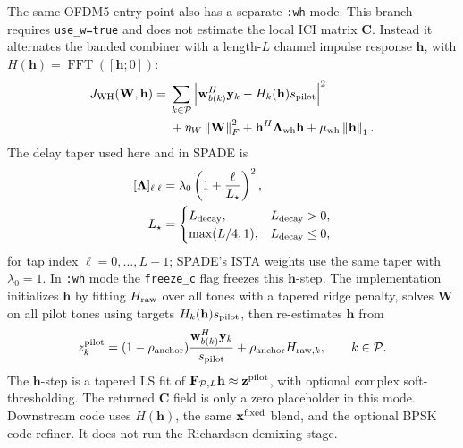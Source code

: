 \documentclass[journal]{IEEEtran}
\newcommand{\norm}[1]{\left\lVert #1 \right\rVert}
\newcommand{\abs}[1]{\left\lvert #1 \right\rvert}
\begin{document}
The same OFDM5 entry point also has a separate \texttt{:wh} mode. This branch
requires \texttt{use\_w=true} and does not estimate the local ICI matrix
\(\mathbf C\). Instead it alternates the banded combiner with a length-\(L\)
channel impulse response \(\mathbf h\), with
\(H(\mathbf h)=\operatorname{FFT}([\mathbf h;0])\):
\begin{equation}
\begin{aligned}
  J_{\rm WH}(\mathbf W,\mathbf h)
  ={}&\sum_{k\in\mathcal P}
    \abs{\mathbf w_{b(k)}^H\mathbf y_k-H_k(\mathbf h)s_{\rm pilot}}^2\\
  &+\eta_W\norm{\mathbf W}_F^2
    +\mathbf h^H\boldsymbol\Lambda_{\rm wh}\mathbf h
    +\mu_{\rm wh}\norm{\mathbf h}_1 .
\end{aligned}
  \label{eq:ofdm5-wh-loss}
\end{equation}
The delay taper used here and in SPADE is
\begin{equation}
\begin{aligned}
  [\boldsymbol\Lambda]_{\ell,\ell}
  &=\lambda_0\left(1+\frac{\ell}{L_\star}\right)^2,\\
  L_\star&=
  \begin{cases}
    L_{\rm decay}, & L_{\rm decay}>0,\\
    \max(L/4,1), & L_{\rm decay}\le0,
  \end{cases}
\end{aligned}
  \label{eq:ofdm5-delay-taper}
\end{equation}
for tap index \(\ell=0,\ldots,L-1\); SPADE's ISTA weights use the same taper
with \(\lambda_0=1\). In \texttt{:wh} mode the \texttt{freeze\_c} flag freezes
this \(\mathbf h\)-step.
The implementation initializes \(\mathbf h\) by fitting \(H_{\rm raw}\) over all
tones with a tapered ridge penalty, solves \(\mathbf W\) on all pilot tones using
targets \(H_k(\mathbf h)s_{\rm pilot}\), then re-estimates \(\mathbf h\) from
\begin{equation}
  z^{\rm pilot}_k
  =(1-\rho_{\rm anchor})
    \frac{\mathbf w_{b(k)}^H\mathbf y_k}{s_{\rm pilot}}
    +\rho_{\rm anchor}H_{{\rm raw},k},\qquad k\in\mathcal P .
\label{eq:ofdm5-wh-zpilot}
\end{equation}
The \(\mathbf h\)-step is a tapered LS fit of
\(\mathbf F_{\mathcal P,L}\mathbf h\approx \mathbf z^{\rm pilot}\), with optional
complex soft-thresholding. The returned \(\mathbf C\) field is only a zero
placeholder in this mode. Downstream code uses \(H(\mathbf h)\), the same
\(\mathbf x^{\rm fixed}\) blend, and the optional BPSK code refiner. It does not
run the Richardson demixing stage.
\end{document}
